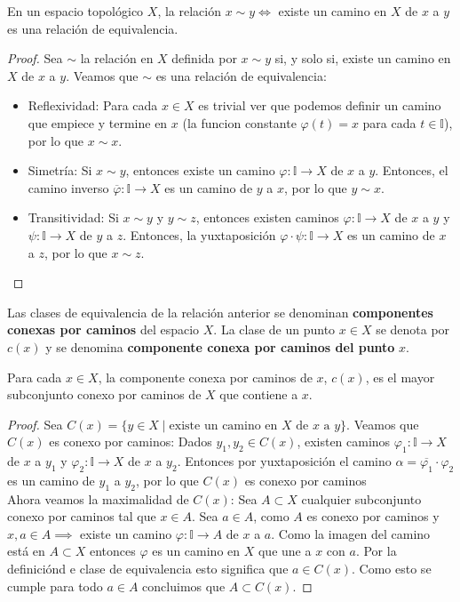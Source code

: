 \begin{proposición}
    En un espacio topológico $X$, la relación $x \sim y \Leftrightarrow$ existe un camino en $X$ de $x$ a $y$ es una relación de equivalencia.
\end{proposición}
\begin{proof}
    Sea $\sim$ la relación en $X$ definida por $x \sim y$ si, y solo si, existe un camino en $X$ de $x$ a $y$. Veamos que $\sim$ es una relación de equivalencia:
    \begin{itemize}
        \item Reflexividad: Para cada $x \in X$ es trivial ver que podemos definir un camino que empiece y termine en $x$ (la funcion constante $\varphi(t) = x$ para cada $t \in \mathbb{I}$), por lo que $x \sim x$.
        \item Simetría: Si $x \sim y$, entonces existe un camino $\varphi \colon \mathbb{I} \to X$ de $x$ a $y$. Entonces, el camino inverso $\overline{\varphi} \colon \mathbb{I} \to X$ es un camino de $y$ a $x$, por lo que $y \sim x$.
        \item Transitividad: Si $x \sim y$ y $y \sim z$, entonces existen caminos $\varphi \colon \mathbb{I} \to X$ de $x$ a $y$ y $\psi \colon \mathbb{I} \to X$ de $y$ a $z$. Entonces, la yuxtaposición $\varphi \cdot \psi \colon \mathbb{I} \to X$ es un camino de $x$ a $z$, por lo que $x \sim z$.
    \end{itemize}
\end{proof}
\begin{definición}
    Las clases de equivalencia de la relación anterior se denominan \textbf{componentes conexas por caminos} del espacio $X$. La clase de un punto $x \in X$ se denota por $c(x)$ y se denomina \textbf{componente conexa por caminos del punto} $x$.
\end{definición}
\begin{proposición}
    Para cada $x \in X$, la componente conexa por caminos de $x$, $c(x)$, es el mayor subconjunto conexo por caminos de $X$ que contiene a $x$.
\end{proposición}
\begin{proof}
    Sea $C(x) = \{y \in X \mid \text{existe un camino en } X \text{ de } x \text{ a } y\}$. Veamos que $C(x)$ es conexo por caminos: Dados $y_1, y_2 \in C(x)$, existen caminos $\varphi_1 \colon \mathbb{I} \to X$ de $x$ a $y_1$ y $\varphi_2 \colon \mathbb{I} \to X$ de $x$ a $y_2$. Entonces por yuxtaposición el camino $\alpha = \overline{\varphi_1} \cdot \varphi_2$ es un camino de $y_1$ a $y_2$, por lo que $C(x)$ es conexo por caminos \\
    Ahora veamos la maximalidad de $C(x)$: Sea $A \subset X$ cualquier subconjunto conexo por caminos tal que $x \in A$. Sea $a \in A$, como $A$ es conexo por caminos y $x, a \in A \implies$ existe un camino $\varphi \colon \mathbb{I} \to A$ de $x$ a $a$. Como la imagen del camino está en $A \subset X$ entonces $\varphi$ es un camino en $X$ que une a $x$ con $a$. Por la definiciónd e clase de equivalencia esto significa que $a \in C(x)$. Como esto se cumple para todo $a \in A$ concluimos que $A \subset C(x)$. 
\end{proof}
